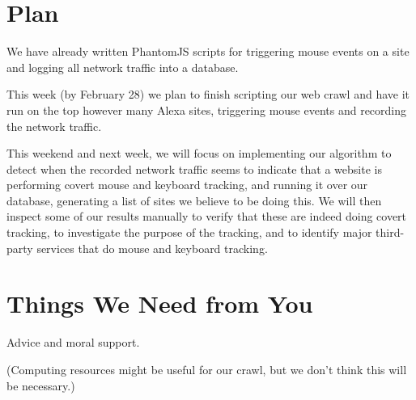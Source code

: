 \documentclass[letterpaper,twocolumn,10pt]{article}
\begin{document}
\section{Plan}

We have already written PhantomJS scripts for triggering mouse events on a site and logging all network traffic into a database.

This week (by February 28) we plan to finish scripting our web crawl and have it run on the top however many Alexa sites, triggering mouse events and recording the network traffic.

This weekend and next week, we will focus on implementing our algorithm to detect when the recorded network traffic seems to indicate that a website is performing covert mouse and keyboard tracking, and running it over our database, generating a list of sites we believe to be doing this. We will then inspect some of our results manually to verify that these are indeed doing covert tracking, to investigate the purpose of the tracking, and to identify major third-party services that do mouse and keyboard tracking.

\section{Things We Need from You}
Advice and moral support.

(Computing resources might be useful for our crawl, but we don't think this will be necessary.)

{\footnotesize 
}


\let\footnote=\endnote
\theendnotes
\end{document}
